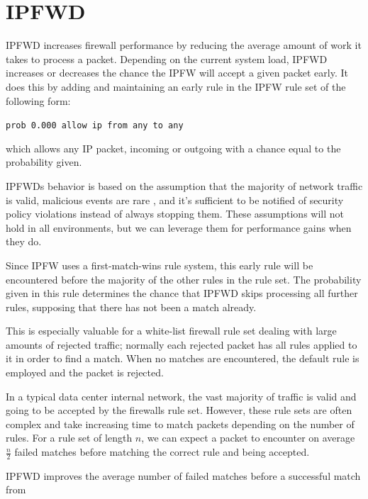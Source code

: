 \documentclass[journal]{IEEEtran}
\begin{document}
\section{IPFWD}

  IPFWD increases firewall performance by reducing the average amount of work
  it takes to process a packet. Depending on the current system load, IPFWD
  increases or decreases the chance the IPFW will accept a given packet early.
  It does this by adding and maintaining an early rule in the IPFW rule set of
  the following form: 
  \begin{center}
      \verb|prob 0.000 allow ip from any to any|
  \end{center}
  which allows any IP packet, incoming or outgoing with a chance equal to the
  probability given.

  IPFWDs behavior is based on the assumption that the majority of network
  traffic is valid, malicious events are rare \cite{networktrafficanalysis},
  and it's sufficient to be notified of security policy violations instead of
  always stopping them. These assumptions will not hold in all environments,
  but we can leverage them for performance gains when they do.

  Since IPFW uses a first-match-wins rule system, this early rule will be
  encountered before the majority of the other rules in the rule set.  The
  probability given in this rule determines the chance that IPFWD skips
  processing all further rules, supposing that there has not been a match
  already.  

  This is especially valuable for a white-list firewall rule set dealing with
  large amounts of rejected traffic; normally each rejected packet has all
  rules applied to it in order to find a match. When no matches are
  encountered, the default rule is employed and the packet is rejected. 

  In a typical data center internal network, the vast majority of traffic is
  valid and going to be accepted by the firewalls rule set. However, these rule
  sets are often complex and take increasing time to match packets depending on
  the number of rules. For a rule set of length $n$, we can expect a packet to
  encounter on average $\frac{n}{2}$ failed matches before matching the correct
  rule and being accepted.

  IPFWD improves the average number of failed matches before a successful match
  from
\end{document}
